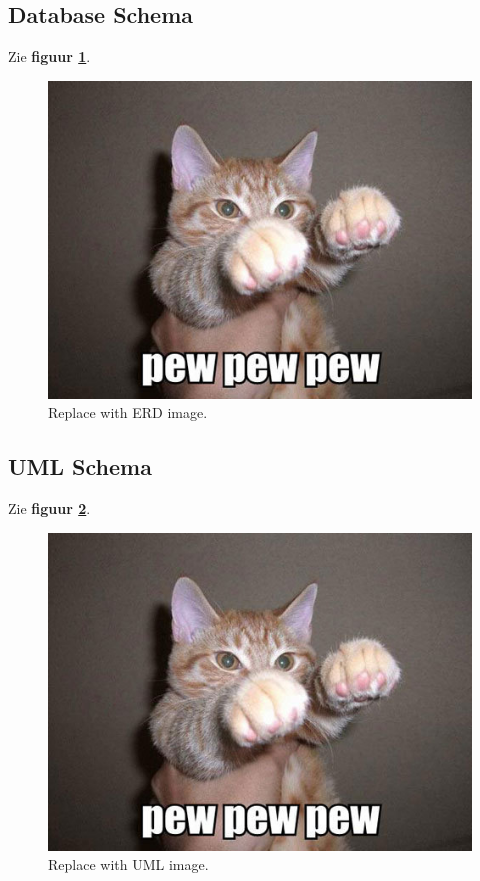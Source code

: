 \documentclass[11pt]{article}
\begin{document}
  \subsection{Database Schema}
  Zie \textbf{figuur \ref{fig:erd}}.
  \begin{figure}[H]
  \centering
    \includegraphics[width=\textwidth]{img/pew_pew.jpg}
  \caption{Replace with ERD image.}
  \label{fig:erd}
  \end{figure}
  
  \subsection{UML Schema}
  Zie \textbf{figuur \ref{fig:uml}}.
  \begin{figure}[H]
  \centering
    \includegraphics[width=\textwidth]{img/pew_pew.jpg}
  \caption{Replace with UML image.}
  \label{fig:uml}
  \end{figure}
\end{document}
